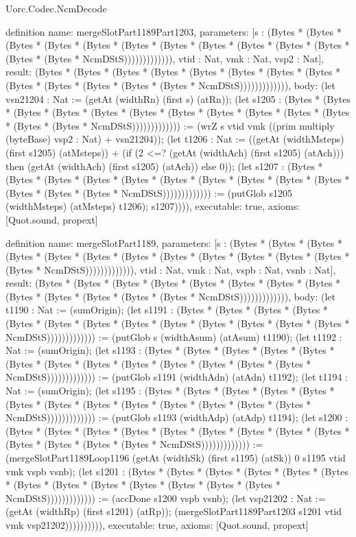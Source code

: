 \begin{lexlean}{Uorc.Codec.NcmDecode}
\begin{semanticmodule}
definition{
  name: mergeSlotPart1189Part1203,
  parameters: [s : (Bytes * (Bytes * (Bytes * (Bytes * (Bytes * (Bytes * (Bytes * (Bytes * (Bytes * (Bytes * (Bytes * (Bytes * (Bytes * NcmDStS))))))))))))), vtid : Nat, vmk : Nat, vsp2 : Nat],
  result: (Bytes * (Bytes * (Bytes * (Bytes * (Bytes * (Bytes * (Bytes * (Bytes * (Bytes * (Bytes * (Bytes * (Bytes * (Bytes * NcmDStS))))))))))))),
  body: (let vsn21204 : Nat := (getAt (widthRn) (first s) (atRn)); (let s1205 : (Bytes * (Bytes * (Bytes * (Bytes * (Bytes * (Bytes * (Bytes * (Bytes * (Bytes * (Bytes * (Bytes * (Bytes * (Bytes * NcmDStS))))))))))))) := (wrZ s vtid vmk ((prim multiply (byteBase) vsp2 : Nat) + vsn21204)); (let t1206 : Nat := ((getAt (widthMsteps) (first s1205) (atMsteps)) + (if (2 <=? (getAt (widthAch) (first s1205) (atAch))) then (getAt (widthAch) (first s1205) (atAch)) else 0)); (let s1207 : (Bytes * (Bytes * (Bytes * (Bytes * (Bytes * (Bytes * (Bytes * (Bytes * (Bytes * (Bytes * (Bytes * (Bytes * (Bytes * NcmDStS))))))))))))) := (putGlob s1205 (widthMsteps) (atMsteps) t1206); s1207)))),
  executable: true,
  axioms: [Quot.sound, propext]
}

definition{
  name: mergeSlotPart1189,
  parameters: [s : (Bytes * (Bytes * (Bytes * (Bytes * (Bytes * (Bytes * (Bytes * (Bytes * (Bytes * (Bytes * (Bytes * (Bytes * (Bytes * NcmDStS))))))))))))), vtid : Nat, vmk : Nat, vspb : Nat, vsnb : Nat],
  result: (Bytes * (Bytes * (Bytes * (Bytes * (Bytes * (Bytes * (Bytes * (Bytes * (Bytes * (Bytes * (Bytes * (Bytes * (Bytes * NcmDStS))))))))))))),
  body: (let t1190 : Nat := (sumOrigin); (let s1191 : (Bytes * (Bytes * (Bytes * (Bytes * (Bytes * (Bytes * (Bytes * (Bytes * (Bytes * (Bytes * (Bytes * (Bytes * (Bytes * NcmDStS))))))))))))) := (putGlob s (widthAsum) (atAsum) t1190); (let t1192 : Nat := (sumOrigin); (let s1193 : (Bytes * (Bytes * (Bytes * (Bytes * (Bytes * (Bytes * (Bytes * (Bytes * (Bytes * (Bytes * (Bytes * (Bytes * (Bytes * NcmDStS))))))))))))) := (putGlob s1191 (widthAdn) (atAdn) t1192); (let t1194 : Nat := (sumOrigin); (let s1195 : (Bytes * (Bytes * (Bytes * (Bytes * (Bytes * (Bytes * (Bytes * (Bytes * (Bytes * (Bytes * (Bytes * (Bytes * (Bytes * NcmDStS))))))))))))) := (putGlob s1193 (widthAdp) (atAdp) t1194); (let s1200 : (Bytes * (Bytes * (Bytes * (Bytes * (Bytes * (Bytes * (Bytes * (Bytes * (Bytes * (Bytes * (Bytes * (Bytes * (Bytes * NcmDStS))))))))))))) := (mergeSlotPart1189Loop1196 (getAt (widthSk) (first s1195) (atSk)) 0 s1195 vtid vmk vspb vsnb); (let s1201 : (Bytes * (Bytes * (Bytes * (Bytes * (Bytes * (Bytes * (Bytes * (Bytes * (Bytes * (Bytes * (Bytes * (Bytes * (Bytes * NcmDStS))))))))))))) := (accDone s1200 vspb vsnb); (let vsp21202 : Nat := (getAt (widthRp) (first s1201) (atRp)); (mergeSlotPart1189Part1203 s1201 vtid vmk vsp21202)))))))))),
  executable: true,
  axioms: [Quot.sound, propext]
}


\end{semanticmodule}
\end{lexlean}
